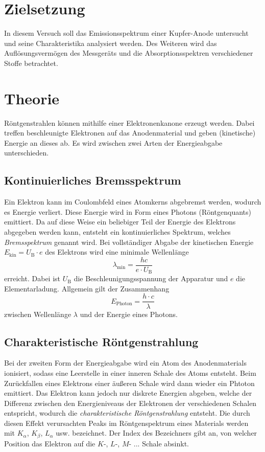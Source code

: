 \section{Zielsetzung}
\label{sec:Ziel}
In diesem Versuch soll das Emissionsspektrum einer Kupfer-Anode untersucht und seine Charakteristika analysiert werden. Des Weiteren wird das Auflösungsvermögen
des Messgeräts und die Absorptionsspektren verschiedener Stoffe betrachtet. 

\section{Theorie}
\label{sec:Theorie}
Röntgenstrahlen können mithilfe einer Elektronenkanone erzeugt werden. Dabei treffen beschleunigte Elektronen auf das Anodenmaterial und geben (kinetische)
Energie an dieses ab. Es wird zwischen zwei Arten der Energieabgabe unterschieden.

\subsection{Kontinuierliches Bremsspektrum}
\label{subsec:Bremsspektrum}
Ein Elektron kann im Coulombfeld eines Atomkerns abgebremst werden,
wodurch es Energie verliert. Diese Energie wird in Form eines Photons (Röntgenquants) emittiert. Da auf diese Weise ein beliebiger Teil der Energie des
Elektrons abgegeben werden kann, entsteht ein kontinuierliches Spektrum, welches \textit{Bremsspektrum} genannt wird.
Bei vollständiger Abgabe der kinetischen Energie $E_\text{kin} = U_\text{B} \cdot e$ des Elektrons wird eine minimale Wellenlänge
\begin{equation}
    \label{eqn:lambda_min}
    \lambda_\text{min} = \frac{h c}{e \cdot U_\text{B}}
\end{equation}
erreicht. Dabei ist $U_\text{B}$ die Beschleunigungsspannung der Apparatur und $e$ die Elementarladung. 
Allgemein gilt der Zusammenhang 
\begin{equation}
    \label{eqn:E_lambda}
    E_\text{Photon} = \frac{h \cdot c}{\lambda}
\end{equation}
zwischen Wellenlänge $\lambda$ und der Energie eines Photons.

\subsection{Charakteristische Röntgenstrahlung} 
\label{subsec:Charakteristische}
Bei der zweiten Form der Energieabgabe wird ein Atom des Anodenmaterials ionisiert, sodass eine Leerstelle in einer inneren Schale des Atoms entsteht. 
Beim Zurückfallen eines Elektrons einer äußeren Schale wird dann wieder ein Phtoton emittiert. Das Elektron kann jedoch nur diskrete Energien abgeben,
welche der Differenz zwischen den Energieniveaus der Elektronen der verschiedenen Schalen entspricht, wodurch die \textit{charakteristische Röntgenstrahlung}
entsteht. Die durch diesen Effekt verursachten Peaks im Röntgenspektrum eines Materials werden mit $K_\alpha$, $K_\beta$, $L_\alpha$ usw. bezeichnet.
Der Index des Bezeichners gibt an, von welcher Position das Elektron auf die $K$-, $L$-, $M$- ... Schale absinkt.


